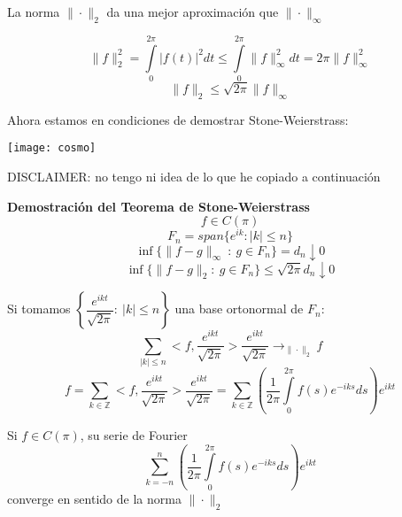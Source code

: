 \documentclass[openany]{book}
\begin{document}
\begin{lemma}$  $

  La norma $ \|\cdot \|_{2} $ da una mejor aproximación que $ \|\cdot \|_{\infty} $


\end{lemma}


\begin{demonstration}

  $$ \|f\|_{2}^2 = \int\limits_{0}^{2\pi}|f(t)|^2 dt \leq  \int\limits_{0}^{2\pi} \|f\|_{\infty}^2 dt = 2 \pi \|f\|^2_{\infty} $$
  $$ \|f\|_{2} \leq  \sqrt{2\pi}\|f\|_{\infty} $$
\end{demonstration}

Ahora estamos en condiciones de demostrar Stone-Weierstrass:

\begin{demonstration}

  \begin{minipage}[l]{0.1\textwidth}
    \texttt{[image: cosmo]}
    \end{minipage}
    \begin{minipage}[l]{0.8\textwidth}
    DISCLAIMER: no tengo ni idea de lo que he copiado a continuación
  \end{minipage}
  

  \textbf{Demostración del Teorema de Stone-Weierstrass}
  $$ f \in C(\pi) $$
  $$ F_n = span \{e^{ik}: |k| \leq n\} $$
  $$  \inf \{\|f-g\|_{\infty}\ :\ g \in F_n\} = d_n \downarrow 0 $$
  $$ \inf \{\|f-g\|_{2}:\ g \in F_n\} \leq  \sqrt{2\pi} d_n \downarrow 0 $$

  Si tomamos  $ \left\{\dfrac{e^{ikt}}{\sqrt{2\pi}}:\ |k| \leq  n\right\} $ una base ortonormal de $ F_n $:
  $$ \sum\limits_{|k|\leq n}^{} <f,\dfrac{e^{ikt}}{\sqrt{2\pi}}> \dfrac{e^{ikt}}{\sqrt{2\pi}} \to_{\|\cdot \|_{2}} f $$
  $$ f = \sum\limits_{k \in \mathbb{Z}}^{} <f, \dfrac{e^{ikt}}{\sqrt{2\pi}}> \dfrac{e^{ikt}}{\sqrt{2\pi}} = \sum\limits_{k \in \mathbb{Z}}^{} \left( \dfrac{1}{2\pi} \int\limits_{0}^{2\pi} f(s) e^{-iks}ds \right) e^{ikt} $$

\end{demonstration}


\begin{theorem}$  $\\
  Si $ f \in C(\pi) $, su serie de Fourier
  $$ \sum\limits_{k=-n}^{n} \left( \dfrac{1}{2\pi} \int\limits_{0}^{2\pi}f(s)e^{-iks}ds \right) e^{ikt} $$
  converge en sentido de la norma $ \|\cdot \|_{2} $
\end{theorem}
\end{document}
